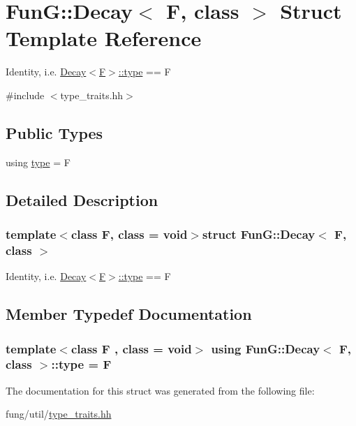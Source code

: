 \hypertarget{structFunG_1_1Decay}{\section{Fun\-G\-:\-:Decay$<$ F, class $>$ Struct Template Reference}
\label{structFunG_1_1Decay}
}


Identity, i.\-e. \hyperlink{structFunG_1_1Decay_a4b2916cbb7c8587ab3fccc9b896b9df4}{Decay$<$\-F$>$\-::type} == F  




{\ttfamily \#include $<$type\-\_\-traits.\-hh$>$}

\subsection*{Public Types}
\begin{DoxyCompactItemize}
\item 
using \hyperlink{structFunG_1_1Decay_a4b2916cbb7c8587ab3fccc9b896b9df4}{type} = F
\end{DoxyCompactItemize}


\subsection{Detailed Description}
\subsubsection*{template$<$class F, class = void$>$struct Fun\-G\-::\-Decay$<$ F, class $>$}

Identity, i.\-e. \hyperlink{structFunG_1_1Decay_a4b2916cbb7c8587ab3fccc9b896b9df4}{Decay$<$\-F$>$\-::type} == F 

\subsection{Member Typedef Documentation}
\hypertarget{structFunG_1_1Decay_a4b2916cbb7c8587ab3fccc9b896b9df4}{
\subsubsection[{type}]{\setlength{\rightskip}{0pt plus 5cm}template$<$class F , class  = void$>$ using {\bf Fun\-G\-::\-Decay}$<$ F, class $>$\-::{\bf type} =  F}}\label{structFunG_1_1Decay_a4b2916cbb7c8587ab3fccc9b896b9df4}


The documentation for this struct was generated from the following file\-:\begin{DoxyCompactItemize}
\item 
fung/util/\hyperlink{type__traits_8hh}{type\-\_\-traits.\-hh}\end{DoxyCompactItemize}
